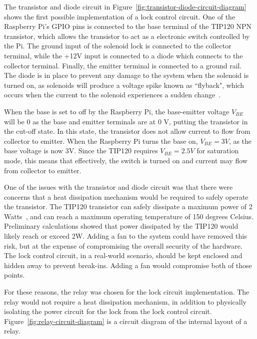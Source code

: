 \documentclass[12pt]{report}
\begin{document}
The transistor and diode circuit in Figure~\ref{fig:transistor-diode-circuit-diagram} shows the first possible 
implementation of a lock control circuit. One of the Raspberry Pi's GPIO pins is connected to the base terminal of the 
TIP120 NPN transistor, which allows the transistor to act as a electronic switch controlled by the Pi. The ground 
input of the solenoid lock is connected to the collector terminal, while the +12V input is connected to a diode which 
connects to the collector terminal. Finally, the emitter terminal is connected to a ground rail. The diode is in place 
to prevent any damage to the system when the solenoid is turned on, as solenoids will produce a voltage spike known as 
``flyback", which occurs when the current to the solenoid experiences a sudden change~\autocite{KICKBACK}.

When the base is set to off by the Raspberry Pi, the base-emitter voltage $V_{BE}$ will be 0 as the base and emitter 
terminals are at 0 V, putting the 
transistor in the cut-off state. In this state, the transistor does not allow current to flow from collector to emitter.
When the Raspberry Pi turns the base on, $V_{BE} = 3V$, as the base voltage is now 3V. Since the TIP120 requires 
$V_{BE} = 2.5V$ for saturation mode, this means that effectively, the switch is turned on and current may flow from 
collector to emitter.

One of the issues with the transistor and diode circuit was that there were concerns that a heat dissipation mechanism 
would be required to safely operate the transistor. The TIP120 transistor can safely dissipate a maximum power of 2 
Watts~\autocite{TIP120}, and can reach a maximum operating temperature of 150 degrees Celsius. Preliminary calculations 
showed that power dissipated by the TIP120 would likely reach or exceed 2W. Adding a fan to the 
system could have removed this risk, but at the expense of compromising the overall security of the hardware. The lock 
control circuit, in a real-world scenario, should be kept enclosed and hidden away to prevent break-ins. Adding a fan 
would compromise both of those points.

For these reasons, the relay was chosen for the lock circuit implementation. The relay would not require a heat 
dissipation mechanism, in addition to physically isolating the power circuit for the lock from the lock control 
circuit. Figure~\ref{fig:relay-circuit-diagram} is a circuit diagram of the internal layout of a relay.
\end{document}
